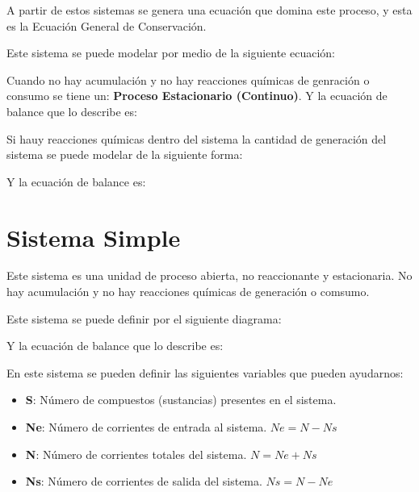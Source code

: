 A partir de estos sistemas se genera una ecuación que domina este proceso, y esta es la Ecuación General de Conservación.


Este sistema se puede modelar por medio de la siguiente ecuación:


Cuando no hay acumulación y no hay reacciones químicas de genración o consumo se tiene un: \textbf{Proceso Estacionario (Continuo)}. Y la ecuación de balance que lo describe es:

Si hauy reacciones químicas dentro del sistema la cantidad de generación del sistema se puede modelar de la siguiente forma:


Y la ecuación de balance es:


\clearpage
\section{Sistema Simple}

Este sistema es una unidad de proceso abierta, no reaccionante y estacionaria. No hay acumulación y no hay reacciones químicas de generación o comsumo.

Este sistema se puede definir por el siguiente diagrama:


Y la ecuación de balance que lo describe es:


En este sistema se pueden definir las siguientes variables que pueden ayudarnos:

\begin{itemize}
    \item \textbf{S}: Número de compuestos (sustancias) presentes en el sistema.
    \item \textbf{Ne}: Número de corrientes de entrada al sistema. $Ne=N-Ns$
    \item \textbf{N}: Número de corrientes totales del sistema. $N=Ne+Ns$
    \item \textbf{Ns}: Número de corrientes de salida del sistema. $Ns=N-Ne$
\end{itemize}

